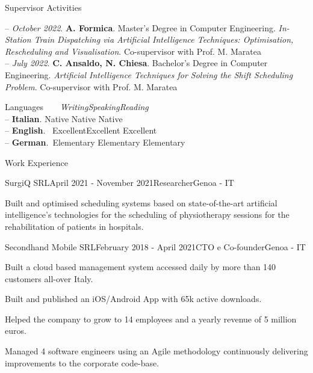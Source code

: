 \documentclass{resume} %
\begin{document}
\pagebreak


\begin{rSection}{Supervisor Activities}

-- \textit{October 2022}. \textbf{A. Formica}. Master's Degree in Computer Engineering. \textit{In-Station Train Dispatching via Artificial Intelligence Techniques: Optimisation, Rescheduling and Visualisation}. Co-supervisor with Prof. M. Maratea\\
-- \textit{July 2022}. \textbf{C. Ansaldo, N. Chiesa}. Bachelor's Degree in Computer Engineering. \textit{Artificial Intelligence Techniques for Solving the Shift Scheduling Problem}. Co-supervisor with Prof. M. Maratea
\end{rSection}

\begin{rSection}{Languages}
\qquad\qquad\,\,\,\,\,\,\,\, \textit{Writing}\hfill\textit{Speaking}\hfill\textit{Reading}\\
-- \textbf{Italian}. \quad Native \hfill Native \hfill  Native\\
-- \textbf{English}. \-\, Excellent\hfill Excellent \hfill Excellent\\
-- \textbf{German}. \-\,Elementary \hfill Elementary \hfill Elementary\\
\end{rSection}




\begin{rSection}{Work Experience}


\begin{rSubsection}{SurgiQ SRL}{April 2021 - November 2021}{Researcher}{Genoa - IT}
\item Built and optimised scheduling systems based on state-of-the-art artificial intelligence's technologies for the scheduling of physiotherapy sessions for the rehabilitation of patients in hospitals.
\end{rSubsection}

\begin{rSubsection}{Secondhand Mobile SRL}{February 2018 - April 2021}{CTO e Co-founder}{Genoa - IT}
\item Built a cloud based management system accessed daily by more than 140 customers all-over Italy. 
\item Built and published an iOS/Android App with 65k active downloads. 
\item Helped the company to grow to 14 employees and a yearly revenue of 5 million euros. 
\item Managed 4 software engineers using an Agile methodology continuously delivering improvements to the corporate code-base.
\end{rSubsection}




\end{rSection}



\end{document}
